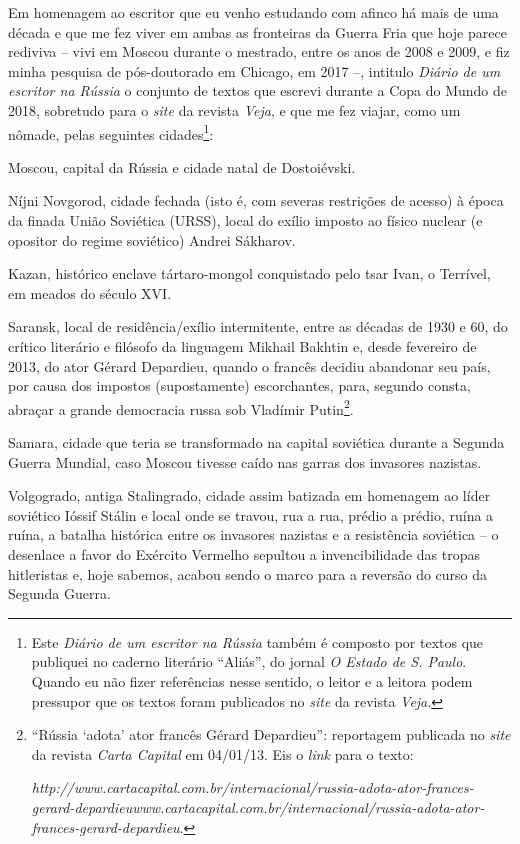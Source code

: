 Em homenagem ao escritor que eu venho estudando com afinco há mais de
uma década e que me fez viver em ambas as fronteiras da Guerra Fria que
hoje parece rediviva -- vivi em Moscou durante o mestrado, entre os anos
de 2008 e 2009, e fiz minha pesquisa de pós-doutorado em Chicago, em
2017 --, intitulo \emph{Diário de um escritor na Rússia} o conjunto de
textos que escrevi durante a Copa do Mundo de 2018, sobretudo para o
\emph{site} da revista \emph{Veja}, e que me fez viajar, como um nômade,
pelas seguintes cidades\footnote{Este \emph{Diário de um escritor na
  Rússia} também é composto por textos que publiquei no caderno
  literário ``Aliás'', do jornal \emph{O Estado de S. Paulo}. Quando eu
  não fizer referências nesse sentido, o leitor e a leitora podem
  pressupor que os textos foram publicados no \emph{site} da revista
  \emph{Veja}.}:

Moscou, capital da Rússia e cidade natal de Dostoiévski.

Níjni Novgorod, cidade fechada (isto é, com severas restrições de
acesso) à época da finada União Soviética (URSS), local do exílio
imposto ao físico nuclear (e opositor do regime soviético) Andrei
Sákharov.

Kazan, histórico enclave tártaro-mongol conquistado pelo tsar Ivan, o
Terrível, em meados do século XVI.

Saransk, local de residência/exílio intermitente, entre as décadas de
1930 e 60, do crítico literário e filósofo da linguagem Mikhail Bakhtin
e, desde fevereiro de 2013, do ator Gérard Depardieu, quando o francês
decidiu abandonar seu país, por causa dos impostos (supostamente)
escorchantes, para, segundo consta, abraçar a grande democracia russa
sob Vladímir Putin\footnote{``Rússia `adota' ator francês Gérard
  Depardieu'': reportagem publicada no \emph{site} da revista
  \emph{Carta Capital} em 04/01/13. Eis o \emph{link} para o texto:

  \emph{http://www.cartacapital.com.br/internacional/russia-adota-ator-frances-gerard-depardieu}{\emph{www.cartacapital.com.br/internacional/russia-adota-ator-frances-gerard-depardieu}}.}.

Samara, cidade que teria se transformado na capital soviética durante a
Segunda Guerra Mundial, caso Moscou tivesse caído nas garras dos
invasores nazistas.

Volgogrado, antiga Stalingrado, cidade assim batizada em homenagem ao
líder soviético Ióssif Stálin e local onde se travou, rua a rua, prédio
a prédio, ruína a ruína, a batalha histórica entre os invasores nazistas
e a resistência soviética -- o desenlace a favor do Exército Vermelho
sepultou a invencibilidade das tropas hitleristas e, hoje sabemos,
acabou sendo o marco para a reversão do curso da Segunda Guerra.

